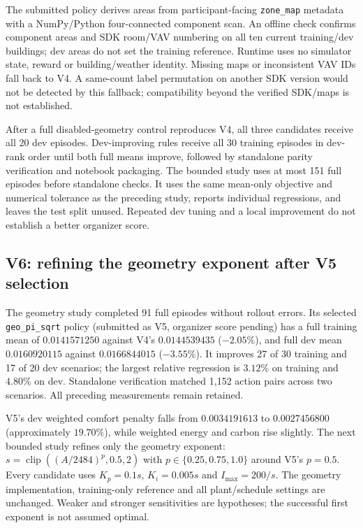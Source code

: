 The submitted policy derives areas from participant-facing \texttt{zone\_map}
metadata with a NumPy/Python four-connected component scan. An offline check
confirms component areas and SDK room/VAV numbering on all ten current
training/dev buildings; dev areas do not set the training reference. Runtime
uses no simulator state, reward or building/weather identity. Missing maps or
inconsistent VAV IDs fall back to V4. A same-count label permutation on another
SDK version would not be detected by this fallback; compatibility beyond
the verified SDK/maps is not established.

After a full disabled-geometry control reproduces V4, all three candidates
receive all 20 dev episodes. Dev-improving rules receive all 30 training
episodes in dev-rank order until both full means improve, followed by
standalone parity verification and notebook packaging. The bounded study
uses at most 151 full episodes before standalone checks. It uses the same
mean-only objective and numerical tolerance as the preceding study, reports
individual regressions, and leaves the test split unused. Repeated dev tuning
and a local improvement do not establish a better organizer score.



\subsection{V6: refining the geometry exponent after V5 selection}
The geometry study completed 91 full episodes without rollout errors. Its
selected \texttt{geo\_pi\_sqrt} policy (submitted as V5, organizer score pending)
has a full training mean of $0.0141571250$ against V4's $0.0144539435$
($-2.05\%$), and full dev mean $0.0160920115$ against $0.0166844015$
($-3.55\%$). It improves 27 of 30 training and 17 of 20 dev scenarios;
the largest relative regression is $3.12\%$ on training and $4.80\%$ on dev.
Standalone verification matched 1,152 action pairs across two scenarios.
All preceding measurements remain retained.

V5's dev weighted comfort penalty falls from $0.0034191613$ to
$0.0027456800$ (approximately $19.70\%$), while weighted energy and carbon
rise slightly. The next bounded study refines only the geometry exponent:
$s=\operatorname{clip}((A/2484)^p,0.5,2)$ with
$p\in\{0.25,0.75,1.0\}$ around V5's $p=0.5$.
Every candidate uses $K_p=0.1s$, $K_i=0.005s$ and $I_{\max}=200/s$.
The geometry implementation, training-only reference and all plant/schedule
settings are unchanged. Weaker and stronger sensitivities are hypotheses;
the successful first exponent is not assumed optimal.

